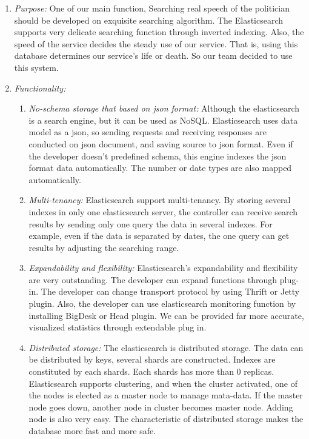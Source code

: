 \documentclass[conference]{IEEEtran}
\begin{document}
\vspace{30mm}
\begin{enumerate} 
  \item \textit{Purpose: } One of our main function, Searching real speech of the politician should be developed on exquisite searching algorithm. The Elasticsearch supports very delicate searching function through inverted indexing. Also, the speed of the service decides the steady use of our service. That is, using this database determines our service’s life or death. So our team decided to use this system.\\
  \item \textit{Functionality: } 	
  	 \begin{enumerate}

	\item \textit {No-schema storage that based on json format: }   Although the elasticsearch is a search engine, but it can be used as NoSQL. Elasticsearch uses data model as a json, so sending requests and receiving responses are conducted on json document, and saving source to json format. Even if the developer doesn’t predefined schema, this engine indexes the json format data automatically. The number or date types are also mapped automatically.\
	  
	\item \textit {Multi-tenancy: }Elasticsearch support multi-tenancy. By storing several indexes in only one elasticsearch server, the controller can receive search results by sending only one query the data in several indexes. For example, even if the data is separated by dates, the one query can get results by adjusting the searching range.\
	
	\item \textit {Expandability and flexibility: }Elasticsearch’s expandability and flexibility are very outstanding. The developer can expand functions through plug-in. The developer can change transport protocol by using Thrift or Jetty plugin. Also, the developer can use elasticsearch monitoring function by installing BigDesk or Head plugin. We can be provided far more accurate, visualized statistics through extendable plug in.\
		
	\item \textit {Distributed storage: }The elasticsearch is distributed storage. The data can be distributed by keys, several shards are constructed. Indexes are constituted by each shards. Each shards has more than 0 replicas. Elasticsearch supports clustering, and when the cluster activated, one of the nodes is elected as a master node to manage mata-data. If the master node goes down, another node in cluster becomes master node. Adding node is also very easy. The characteristic of distributed storage makes the database more fast and more safe.\
			

\end{enumerate}
\end{enumerate}
\end{document}
